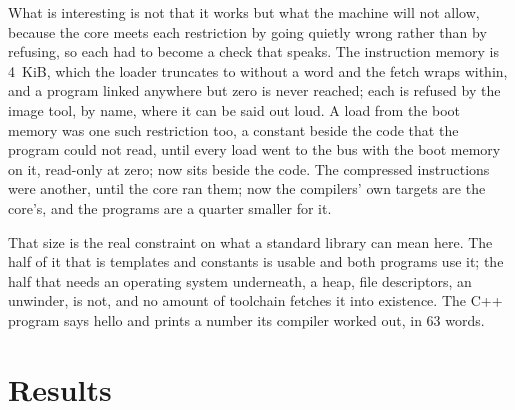 \documentclass[journal,9pt]{IEEEtran}
\begin{document}
What is interesting is not that it works but what the machine will
not allow, because the core meets each restriction by going quietly
wrong rather than by refusing, so each had to become a check that
speaks. The instruction memory is 4~KiB, which the loader truncates
to without a word and the fetch wraps within, and a program linked
anywhere but zero is never reached; each is refused by the image
tool, by name, where it can be said out loud. A load from the boot
memory was one such restriction too, a constant beside the code that
the program could not read, until every load went to the bus with the
boot memory on it, read-only at zero;  now sits beside
the code. The compressed instructions were another, until the core
ran them; now the compilers' own targets
are the core's, and the programs are a quarter smaller for it.

That size is the real constraint on what a standard library can mean
here. The half of it that is templates and constants is usable and
both programs use it; the half that needs an operating system
underneath, a heap, file descriptors, an unwinder, is not, and no
amount of toolchain fetches it into existence. The C++ program says
hello and prints a number its compiler worked out, in 63 words.

\section{Results}
\label{sec:p-results}
\end{document}
